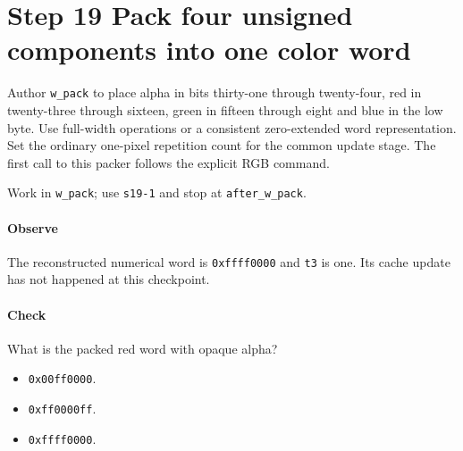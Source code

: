 \section{Step 19 Pack four unsigned components into one color word}\label{qoi-s19}
Author \texttt{w\_pack} to place alpha in bits thirty-one through twenty-four, red in twenty-three through sixteen, green in fifteen through eight and blue in the low byte. Use full-width operations or a consistent zero-extended word representation. Set the ordinary one-pixel repetition count for the common update stage. The first call to this packer follows the explicit RGB command.

Work in \texttt{w\_pack}; use \texttt{s19-1} and stop at \texttt{after\_w\_pack}.

\paragraph{Observe} The reconstructed numerical word is \texttt{0xffff0000} and \texttt{t3} is one. Its cache update has not happened at this checkpoint.

\paragraph{Check} What is the packed red word with opaque alpha?
\begin{itemize}
\item[A.] \texttt{0x00ff0000}.
\item[B.] \texttt{0xff0000ff}.
\item[C.] \texttt{0xffff0000}.
\end{itemize}
